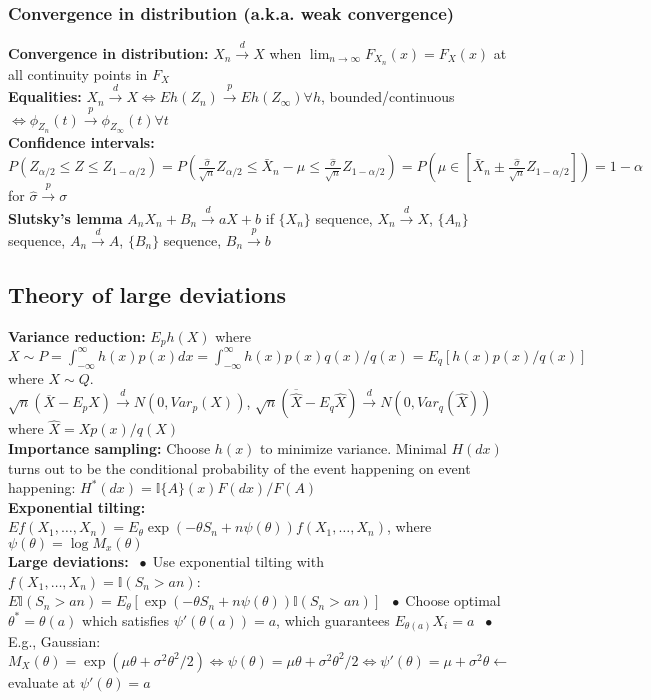 \documentclass[9pt]{extarticle}
\newcommand*\bspace{$\; \bullet \;$}
\begin{document}
\subsubsection{Convergence in distribution (a.k.a. weak convergence)}
\textbf{Convergence in distribution: } $X_n \overset{d}{\longrightarrow} X$ when $\lim_{n\longrightarrow \infty} F_{X_n}(x) = F_X(x)$ at all continuity points in $F_X$\\
\textbf{Equalities: } $X_n \overset{d}{\longrightarrow} X \Longleftrightarrow Eh(Z_n) \overset{p}{\longrightarrow} Eh(Z_\infty) \forall h$, bounded/continuous $\Longleftrightarrow \phi_{Z_n}(t) \overset{p}{\longrightarrow} \phi_{Z_\infty}(t) \forall t$\\
\textbf{Confidence intervals: } $P(Z_{\alpha / 2} \leq Z \leq Z_{1-\alpha / 2}) = P(\frac{\hat{\sigma}}{\sqrt{n}}Z_{\alpha/ 2} \leq \bar{X}_n - \mu \leq \frac{\hat{\sigma}}{\sqrt{n}}Z_{1-\alpha / 2}) = P(\mu \in \left[\bar{X}_n \pm \frac{\hat{\sigma}}{\sqrt{n}}Z_{1-\alpha/2}\right]) = 1-\alpha$ for $\hat{\sigma}\overset{p}{\longrightarrow} \sigma$\\
\textbf{Slutsky's lemma}
$A_nX_n + B_n \overset{d}{\rightarrow} aX + b$ if $\{X_n\}$ sequence, $X_n \overset{d}{\rightarrow} X$,  $\{A_n\}$ sequence, $A_n \overset{d}{\rightarrow} A$, $\{B_n\}$ sequence, $B_n \overset{p}{\rightarrow} b$



\subsection{Theory of large deviations}
\textbf{Variance reduction: } $E_ph(X)$ where $X \sim P = \int_{-\infty}^\infty h(x) p(x)dx = \int_{-\infty}^\infty h(x) p(x) q(x) / q(x) = E_q[h(x)p(x)/q(x)]$ where $X \sim Q$.\\
$\sqrt{n}(\overline{X} - E_pX) \overset{d}{\longrightarrow} N(0, Var_p(X))$, $\sqrt{n}(\overline{\hat{X}} - E_q\hat{X}) \overset{d}{\longrightarrow} N(0, Var_q(\hat{X}))$ where $\hat{X} = Xp(x)/q(X)$\\
\textbf{Importance sampling:} Choose $h(x)$ to minimize variance. Minimal $H(dx)$ turns out to be the conditional probability of the event happening on event happening: $H^*(dx) = \mathbb{I}\{A\}(x)F(dx)/F(A)$\\
\textbf{Exponential tilting:} $Ef(X_1, \dots, X_n) = E_\theta \exp(-\theta S_n + n \psi(\theta))f(X_1, \dots, X_n)$, where $\psi(\theta) = \log{M_x(\theta)}$\\
\textbf{Large deviations:} \bspace Use exponential tilting with $f(X_1, \dots, X_n) = \mathbb{I}(S_n > an)$: $E\mathbb{I}(S_n > an) = E_\theta[ \exp(-\theta S_n + n \psi(\theta))\mathbb{I}(S_n > an)]$ \bspace Choose optimal $\theta^* = \theta(a)$ which satisfies $\psi'(\theta(a)) = a$, which guarantees $E_{\theta(a)}X_i = a$ \bspace E.g., Gaussian: $M_X(\theta) = \exp(\mu\theta + \sigma^2\theta^2/2) \Longleftrightarrow \psi(\theta) = \mu\theta + \sigma^2\theta^2/2 \Longleftrightarrow \psi'(\theta) = \mu + \sigma^2\theta \leftarrow$ evaluate at $\psi'(\theta) = a$
\end{document}
